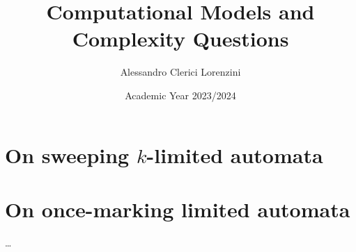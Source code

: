 \documentclass[a4paper]{report}
\title{Computational Models and Complexity Questions}
\author{Alessandro Clerici Lorenzini}
\date{Academic Year 2023/2024}
\begin{document}
\maketitle

\tableofcontents




\part{On sweeping \texorpdfstring{$k$}{k}-limited automata}



\part{On once-marking limited automata}
\dots

\printbibliography
\end{document}
